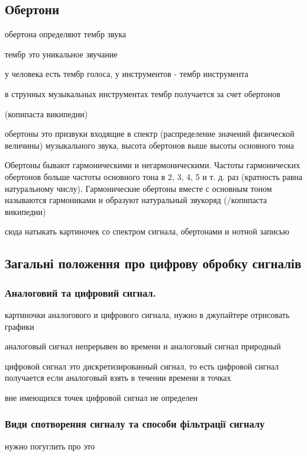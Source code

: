 \subsection{Обертони}

обертона определяют тембр звука

тембр это уникальное звучание 

у человека есть тембр голоса, у инструментов - тембр инструмента

в струнных музыкальных инструментах тембр получается за счет обертонов

(копипаста википедии)

обертоны это призвуки входящие в спектр (распределение значений физической величины) музыкального звука, высота обертонов выше высоты основного тона

Обертоны бывают гармоническими и негармоническими. Частоты гармонических обертонов больше частоты основного тона в 2, 3, 4, 5 и т. д. раз (кратность равна натуральному числу). Гармонические обертоны вместе с основным тоном называются гармониками и образуют натуральный звукоряд (/копипаста википедии)

сюда натыкать картиночек со спектром сигнала, обертонами и нотной записью

\subsection{Загальні положення про цифрову обробку сигналів}

\subsubsection{Аналоговий та цифровий сигнал.}

картиночки аналогового и цифрового сигнала, нужно в джупайтере отрисовать графики

аналоговый сигнал непрерывен во времени и аналоговый сигнал природный

цифровой сигнал это дискретизированный сигнал, то есть цифровой сигнал получается если аналоговый взять в течении времени в точках

вне имеющихся точек цифровой сигнал не определен

\subsubsection{Види спотворення сигналу та способи фільтрації сигналу}

нужно погуглить про это

